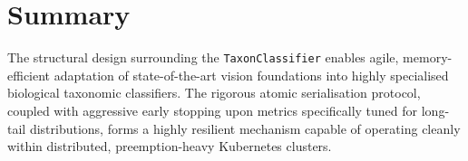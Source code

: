 \section{Summary}

The structural design surrounding the \texttt{TaxonClassifier} enables agile, memory-efficient adaptation of state-of-the-art vision foundations into highly specialised biological taxonomic classifiers. The rigorous atomic serialisation protocol, coupled with aggressive early stopping upon metrics specifically tuned for long-tail distributions, forms a highly resilient mechanism capable of operating cleanly within distributed, preemption-heavy Kubernetes clusters.
